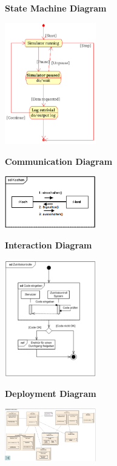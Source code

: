 \documentclass{report}
\newenvironment{Figure}
	{\par\medskip\noindent\minipage{\linewidth}}
	{\endminipage\par\medskip}
\theoremstyle{definition}
\theoremstyle{example}
\begin{document}
\textbf{State Machine Diagram}
\begin{Figure}
\centering
\includegraphics[width=150px]{img/SMDiagram.png}
	\label{fig:Beispiel eines State Machine Diagram nach UML}
\end{Figure}

\textbf{Communication Diagram}
\begin{Figure}
\centering
\includegraphics[width=150px]{img/CommunicationDiagram.png}
	\label{fig:Beispiel eines Communication Diagram nach UML}
\end{Figure}

\textbf{Interaction Diagram}
\begin{Figure}
\centering
\includegraphics[width=150px]{img/InteractionDiagram.png}
	\label{fig:Beispiel eines Interaction Diagram nach UML}
\end{Figure}

\textbf{Deployment Diagram}
\begin{Figure}
\centering
\includegraphics[width=150px]{img/DeploymentDiagram.png}
	\label{fig:Beispiel eines Deployment Diagram nach UML}
\end{Figure}
\end{document}
